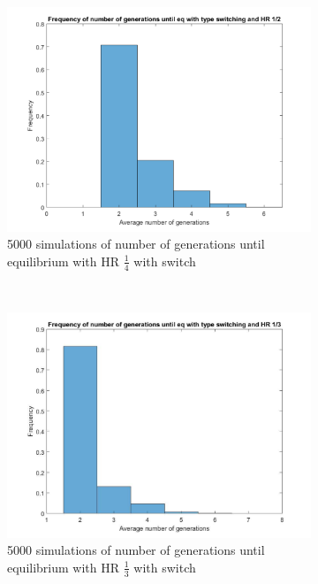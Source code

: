 \begin{figure}[H]
    \centering
    \begin{subfigure}{0.45\textwidth}
        \includegraphics[width=\textwidth]{AantGen1.pdf}
        \caption{5000 simulations of number of generations until equilibrium with HR $\frac{1}{4}$ with switch}
        \label{hists hap 1/4}
    \end{subfigure}
	~
    \begin{subfigure}{0.45\textwidth}
        \includegraphics[width=\textwidth]{AantGen2.pdf}
        \caption{5000 simulations of number of generations until equilibrium with HR $\frac{1}{3}$ with switch}
        \label{hists hap 1/3}
    \end{subfigure}
	~
    \begin{subfigure}{0.45\textwidth}

\end{subfigure}
\end{figure}

